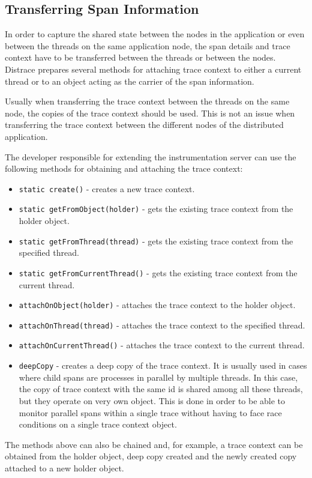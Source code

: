 \subsection{Transferring Span Information}
In order to capture the shared state between the nodes in the application or even between the threads on the same application node, the span details and trace context have to be transferred between the threads or between the nodes. Distrace prepares several methods for attaching trace context to either a current thread or to an object acting as the carrier of the span information.

Usually when transferring the trace context between the threads on the same node, the copies of the trace context should be used. This is not an issue when transferring the trace context between the different nodes of the distributed application.

The developer responsible for extending the instrumentation server can use the following methods for obtaining and attaching the trace context:
\begin{itemize}
	\item \texttt{static create()} - creates a new trace context.
	\item \texttt{static getFromObject(holder)} - gets the existing trace context from the holder object.
	\item \texttt{static getFromThread(thread)} - gets the existing trace context from the specified thread.
	\item \texttt{static getFromCurrentThread()} -  gets the existing trace context from the current thread.
	\item \texttt{attachOnObject(holder)} - attaches the trace context to the holder object.
	\item \texttt{attachOnThread(thread)} - attaches the trace context to the specified \newline thread.
	\item \texttt{attachOnCurrentThread()} - attaches the trace context to the current \newline thread.
	\item \texttt{deepCopy} - creates a deep copy of the trace context. It is usually used in cases where child spans are processes in parallel by multiple threads. In this case, the copy of trace context with the same id is shared among all these threads, but they operate on very own object. This is done in order to be able to monitor parallel spans within a single trace without having to face race conditions on a single trace context object.
\end{itemize}
The methods above can also be chained and, for example, a trace context can be obtained from the holder object, deep copy created and the newly created copy attached to a new holder object.

